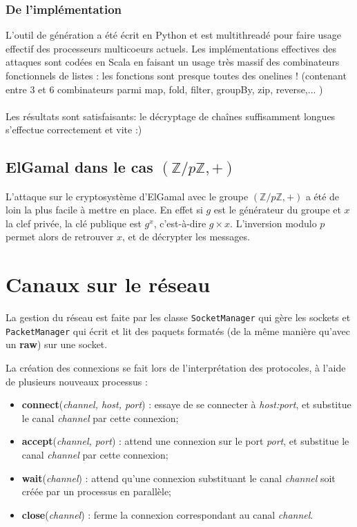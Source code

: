 \documentclass[11pt]{article} %
\begin{document}
  \subsubsection{De l'implémentation}

  L'outil de génération a été écrit en Python et est multithreadé pour faire usage effectif des processeurs multicoeurs actuels. Les implémentations effectives des attaques sont codées en Scala en faisant un usage très massif des combinateurs fonctionnels de listes : les fonctions sont presque toutes des onelines ! (contenant entre 3 et 6 combinateurs parmi map, fold, filter, groupBy, zip, reverse,... )\\\\

  Les résultats sont satisfaisants: le décryptage de chaînes suffisamment longues s'effectue correctement et vite :)

\subsection{ElGamal dans le cas $(\mathbb{Z}/p\mathbb{Z}, +)$}

L'attaque sur le cryptosystème d'ElGamal avec le groupe $(\mathbb{Z}/p\mathbb{Z}, +)$ a été de loin la plus facile à mettre en place. En effet si $g$ est le générateur du groupe et $x$ la clef privée, la clé publique est $g^x$, c'est-à-dire $g\times x$. L'inversion modulo $p$ permet alors de retrouver $x$, et de décrypter les messages.

\section{Canaux sur le réseau}

La gestion du réseau est faite par les classe \texttt{SocketManager} qui gère les sockets et \texttt{PacketManager} qui écrit et lit des paquets formatés (de la même manière qu'avec un \textbf{raw}) sur une socket.

La création des connexions se fait lors de l'interprétation des protocoles, à l'aide de plusieurs nouveaux processus :
\begin{itemize}
  \item \textbf{connect}(\emph{channel, host, port}) : essaye de se connecter à \emph{host:port}, et substitue le canal \emph{channel} par cette connexion;
  \item \textbf{accept}(\emph{channel, port}) : attend une connexion sur le port \emph{port}, et substitue le canal \emph{channel} par cette connexion;
  \item \textbf{wait}(\emph{channel}) : attend qu'une connexion substituant le canal \emph{channel} soit créée par un processus en parallèle;
  \item \textbf{close}(\emph{channel}) : ferme la connexion correspondant au canal \emph{channel}.
\end{itemize}
\end{document}
